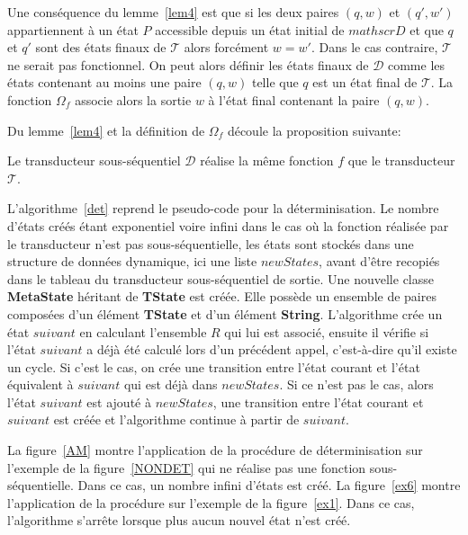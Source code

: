 	Une conséquence du lemme~\ref{lem4} est que si les deux paires $(q,w)$ et $(q',w')$ appartiennent à un état $P$ accessible depuis un état initial de $mathscr{D}$ et que $q$ et $q'$ sont des états finaux de $\mathscr{T}$ alors forcément $w = w'$. Dans le cas contraire, $\mathscr{T}$ ne serait pas fonctionnel. On peut alors définir les états finaux de $\mathscr{D}$ comme les états contenant au moins une paire $(q,w)$ telle que $q$ est un état final de $\mathscr{T}$. La fonction $\Omega_f$ associe alors la sortie $w$ à l'état final contenant la paire $(q,w)$.
	
	Du lemme~\ref{lem4} et la définition de $\Omega_f$ découle la proposition suivante: \\
	
	\begin{proposition}
		Le transducteur sous-séquentiel $\mathscr{D}$ réalise la même fonction $f$ que le transducteur $\mathscr{T}$.
	\end{proposition}
	
	L'algorithme~\ref{det} reprend le pseudo-code pour la déterminisation. Le nombre d'états créés étant exponentiel voire infini dans le cas où la fonction réalisée par le transducteur n'est pas sous-séquentielle, les états sont stockés dans une structure de données dynamique, ici une liste $newStates$, avant d'être recopiés dans le tableau du transducteur sous-séquentiel de sortie. Une nouvelle classe \textbf{MetaState} héritant de \textbf{TState} est créée. Elle possède un ensemble de paires composées d'un élément \textbf{TState} et d'un élément \textbf{String}. L'algorithme crée un état $suivant$ en calculant l'ensemble $R$ qui lui est associé, ensuite il vérifie si l'état $suivant$ a déjà été calculé lors d'un précédent appel, c'est-à-dire qu'il existe un cycle. Si c'est le cas, on crée une transition entre l'état courant et l'état équivalent à $suivant$ qui est déjà dans $newStates$. Si ce n'est pas le cas, alors l'état $suivant$ est ajouté à $newStates$, une transition entre l'état courant et $suivant$ est créée et l'algorithme continue à partir de $suivant$.
	
	La figure~\ref{AM} montre l'application de la procédure de déterminisation sur l'exemple de la figure~\ref{NONDET} qui ne réalise pas une fonction sous-séquentielle. Dans ce cas, un nombre infini d'états est créé. La figure~\ref{ex6} montre l'application de la procédure sur l'exemple de la figure~\ref{ex1}. Dans ce cas, l'algorithme s'arrête lorsque plus aucun nouvel état n'est créé.
	
